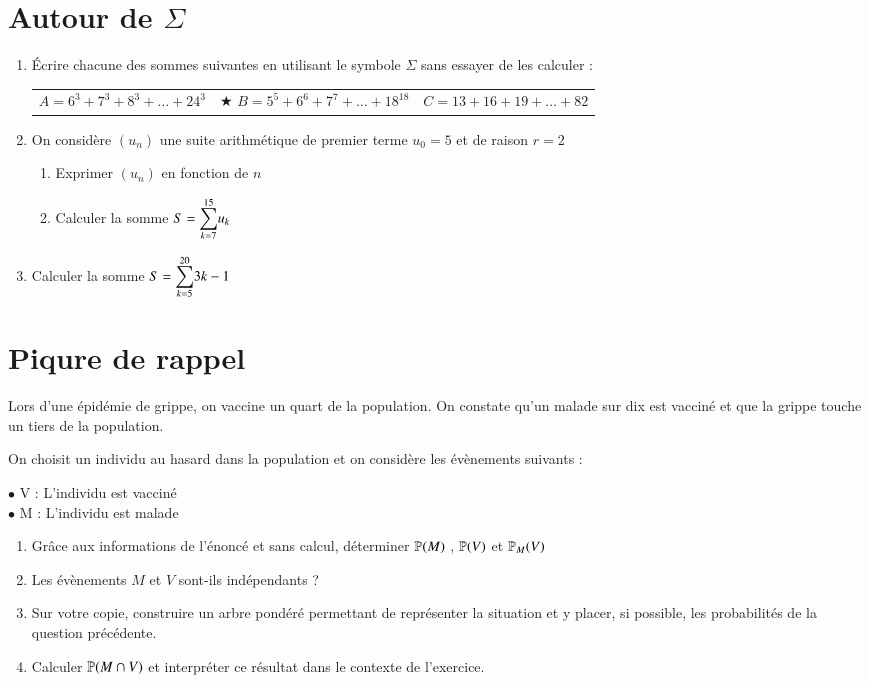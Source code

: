 \documentclass[oneside,12pt]{exam}          %
\begin{document}
\newpage
{}



\section{Autour de $\Sigma$}
\begin{enumerate}[itemsep = 0pt]
	\item Écrire chacune des sommes suivantes en utilisant le symbole $\Sigma$ sans essayer de les calculer :

	\begin{tabular}{p{} p{} p{}}
		$A = 6^3 + 7^3 + 8^3 + \ldots + 24^3$ &
		$\bigstar$ $B = 5^5 + 6^6 + 7^7 + \ldots + 18^{18}$ &
		$C = 13 + 16 + 19 + \ldots + 82$
	\end{tabular}
	
	\item On considère $(u_n)$ une suite arithmétique de premier terme $u_0 = 5$ et de raison $r = 2$
	\begin{enumerate}
		\item Exprimer $(u_n)$ en fonction de $n$
		\item Calculer la somme $S = {\displaystyle\sum_{k=7}^{15}} u_k$
	\end{enumerate}
	\item Calculer la somme $S = {\displaystyle\sum_{k=5}^{20}}3k - 1$
\end{enumerate}



\section{Piqure de rappel}
Lors d'une épidémie de grippe, on vaccine un quart de la population. On constate qu'un malade sur dix est vacciné et que la grippe touche un tiers de la population.

On choisit un individu au hasard dans la population et on considère les évènements suivants :

$\bullet$ V : \og L'individu est vacciné \fg \\
$\bullet$ M : \og L'individu est malade \fg 
\begin{enumerate}[align = left]
	\item Grâce aux informations de l'énoncé et sans calcul, déterminer ${\mathbb P}(M)$ , ${\mathbb P}(V)$ et ${\mathbb P}_M(V)$
	\item Les évènements $M$ et $V$ sont-ils indépendants ?
	\item Sur votre copie, construire un arbre pondéré permettant de représenter la situation et y placer, si possible, les probabilités de la question précédente.
	\item Calculer ${\mathbb P}(M \cap V)$ et interpréter ce résultat dans le contexte de l'exercice.
\end{enumerate}
\end{document}
